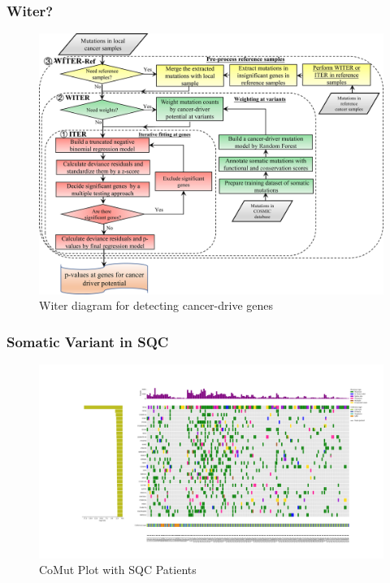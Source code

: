 \documentclass{beamer}
\begin{document}
    \begin{frame}
        \frametitle{Witer?}

        \begin{figure}
            \includegraphics[width=0.6 \linewidth]{figures/Workflow/witer.jpg}
            \caption{Witer diagram for detecting cancer-drive genes \protect\cite{witer1}}
        \end{figure}
    \end{frame}

    \begin{frame}
        \frametitle{Somatic Variant in SQC}

        \begin{figure}
            \includegraphics[width=\linewidth]{figures/Mutect2/Mutect2-SQC.pdf}
            \caption{CoMut Plot with SQC Patients}
        \end{figure}
    \end{frame}
\end{document}
